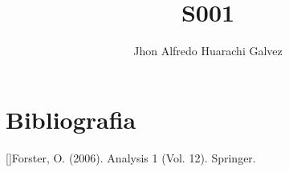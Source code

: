 \documentclass{article}
\title{S001}
\author{Jhon Alfredo Huarachi Galvez}
\begin{document}
\maketitle

\section{Bibliografia}
[]Forster, O. (2006). Analysis 1 (Vol. 12). Springer.
\end{document}
